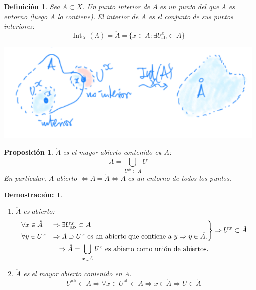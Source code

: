 \documentclass[10pt,a4paper,openright]{book}
\theoremstyle{break}
\newtheorem*{defi}{Definición}
\newtheorem*{prop}{Proposición}
\newtheorem*{demo}{\underline{Demostración}:}
\DeclareMathOperator{\inter}{Int}
\begin{document}
\begin{defi}
Sea $A \subset X$. Un \underline{punto interior de $A$} es un punto del que $A$ es entorno (luego $A$ lo contiene). El \underline{interior de $A$} es el conjunto de sus puntos interiores:
\[
\inter_X \left( A \right) = \mathring{A} = \{x \in A: \exists U_{\text{ab}}^x \subset A\} 
\]
\end{defi}
\begin{center}
    \includegraphics[scale=0.4]{images/def_interior} 
\end{center}

\begin{prop}
$\mathring{A}$ es el mayor abierto contenido en $A$: 
\[
\mathring{A} = \bigcup_{U^{ab} \subset A} U
\]
En particular, $A$ abierto $\Leftrightarrow A = \mathring{A} \Leftrightarrow A$ es un entorno de todos los puntos.    
\end{prop}
\begin{demo}
\begin{enumerate}
    \item $\mathring{A}$ es abierto: 
    \begin{gather*}
        \begin{rcases}
        \forall x \in \mathring{A} &\Rightarrow \exists U_{\text{ab}}^x \subset A\\
        \forall y \in U^x &\Rightarrow A \supset U^x \text{ es un abierto que contiene a } y \Rightarrow y \in \mathring{A}.\\
        \end{rcases} \Rightarrow U^x \subset \mathring{A}\\
        \Rightarrow \mathring{A} = \bigcup_{x \in \mathring{A}} U^x \text{ es abierto como unión de abiertos}
    .\end{gather*}
    \item $\mathring{A}$ es el mayor abierto contenido en $A$.
    \[
    U^{\text{ab}} \subset A \Rightarrow \forall x \in U^{\text{ab}} \subset A \Rightarrow x \in \mathring{A} \Rightarrow U \subset \mathring{A} 
    \]
\end{enumerate}
\end{demo}
\end{document}

